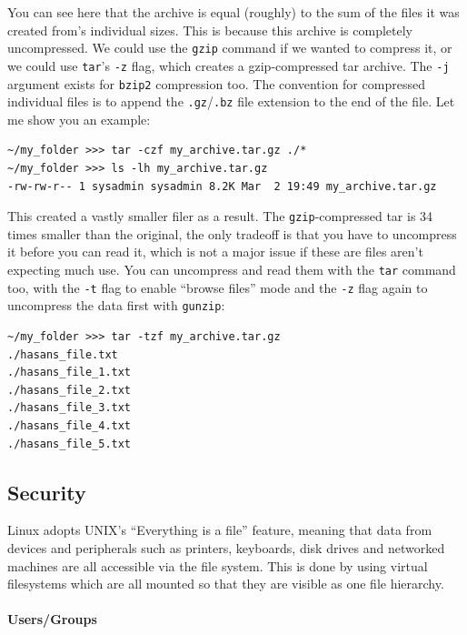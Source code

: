 You can see here that the archive is equal (roughly) to the sum of the files it was created from's individual sizes. This is because this archive is completely uncompressed. We could use the \texttt{gzip} command if we wanted to compress it, or we could use \texttt{tar}'s \texttt{-z} flag, which creates a gzip-compressed tar archive. The \texttt{-j} argument exists for \texttt{bzip2} compression too. The convention for compressed individual files is to append the \texttt{.gz}/\texttt{.bz} file extension to the end of the file. Let me show you an example:


\pagebreak

\begin{verbatim}
~/my_folder >>> tar -czf my_archive.tar.gz ./*
~/my_folder >>> ls -lh my_archive.tar.gz
-rw-rw-r-- 1 sysadmin sysadmin 8.2K Mar  2 19:49 my_archive.tar.gz
\end{verbatim}

This created a vastly smaller filer as a result. The \texttt{gzip}-compressed tar is 34 times smaller than the original, the only tradeoff is that you have to uncompress it before you can read it, which is not a major issue if these are files aren't expecting much use. You can uncompress and read them with the \texttt{tar} command too, with the \texttt{-t} flag to enable ``browse files'' mode and the \texttt{-z} flag again to uncompress the data first with \texttt{gunzip}:

\begin{verbatim}
~/my_folder >>> tar -tzf my_archive.tar.gz
./hasans_file.txt
./hasans_file_1.txt
./hasans_file_2.txt
./hasans_file_3.txt
./hasans_file_4.txt
./hasans_file_5.txt
\end{verbatim}

\hypertarget{security-1}{%
\subsection{Security}\label{security-1}}

Linux adopts UNIX's ``Everything is a file'' feature, meaning that data from devices and peripherals such as printers, keyboards, disk drives and networked machines are all accessible via the file system. This is done by using virtual filesystems which are all mounted so that they are visible as one file hierarchy.

\hypertarget{usersgroups}{%
\paragraph{Users/Groups}\label{usersgroups}}

